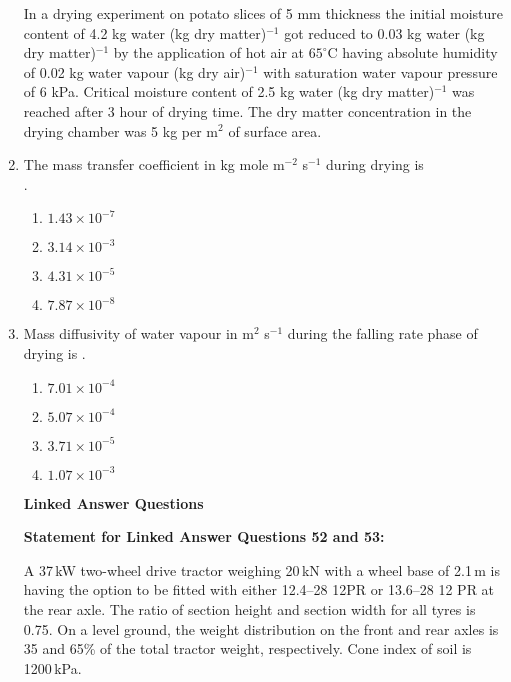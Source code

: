 \documentclass[journal]{IEEEtran}
\numberwithin{equation}{enumi}
\numberwithin{figure}{enumi}
\begin{document}
\begin{enumerate}
In a drying experiment on potato slices of 5 mm thickness the initial moisture content of 4.2 kg water (kg dry matter)$^{-1}$ got reduced to 0.03 kg water (kg dry matter)$^{-1}$ by the application of hot air at $65^\circ$C having absolute humidity of 0.02 kg water vapour (kg dry air)$^{-1}$ with saturation water vapour pressure of 6 kPa. Critical moisture content of 2.5 kg water (kg dry matter)$^{-1}$ was reached after 3 hour of drying time. The dry matter concentration in the drying chamber was 5 kg per m$^2$ of surface area.
\vspace{0.125cm}
\item  The mass transfer coefficient in kg mole m$^{-2}$ s$^{-1}$ during drying is\\ 
. \hfill{}
\begin{multicols}{4}
    \begin{enumerate}
    \item $1.43 \times 10^{-7}$
    \item $3.14 \times 10^{-3}$
    \item $4.31 \times 10^{-5}$
    \item $7.87 \times 10^{-8}$
    \end{enumerate}
    \end{multicols}  




\item  Mass diffusivity of water vapour in m$^2$ s$^{-1}$ during the falling rate phase of drying is 
. \hfill{}
\begin{multicols}{4}
    \begin{enumerate}
    \item $7.01 \times 10^{-4}$ 
    \item $5.07 \times 10^{-4}$
    \item  $3.71 \times 10^{-5}$
    \item $1.07 \times 10^{-3}$
    \end{enumerate}
    \end{multicols}  


\large{\textbf {Linked Answer Questions}}

\textbf{Statement for Linked Answer Questions 52 and 53:}

A 37\,kW two-wheel drive tractor weighing 20\,kN with a wheel base of 2.1\,m is having the option to be fitted with either 12.4--28 12PR or 13.6--28 12 PR at the rear axle. The ratio of section height and section width for all tyres is 0.75. On a level ground, the weight distribution on the front and rear axles is 35 and 65\% of the total tractor weight, respectively. Cone index of soil is 1200\,kPa.
\vspace{0.25cm}



\end{enumerate}
\end{document}
